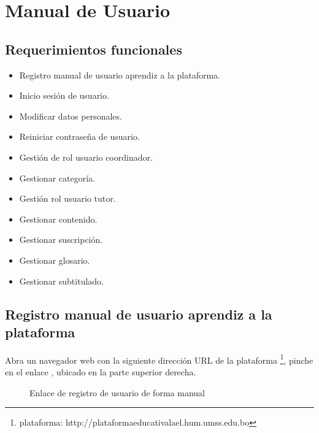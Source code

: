\chapter{Manual de Usuario}

\section{Requerimientos funcionales}

\begin{itemize}

\item Registro manual de usuario aprendiz a la plataforma.

\item Inicio sesión de usuario.

\item Modificar datos personales.
	
\item Reiniciar contraseña de usuario.

\item Gestión de rol usuario coordinador.

\item Gestionar categoría.

\item Gestión rol usuario tutor.

\item Gestionar contenido.

\item Gestionar suscripción.

\item Gestionar glosario.

\item Gestionar subtitulado.

\end{itemize}

\section{Registro manual de usuario aprendiz a la plataforma} \label{sec:createManualUser}

Abra un navegador web con la siguiente dirección URL de la plataforma 
\footnote{plataforma: http://plataformaeducativalael.hum.umss.edu.bo}, pinche
en el enlace , ubicado en la parte superior
derecha.

\begin{figure}[!ht]
\centering
		\caption{Enlace de registro de usuario de forma manual}
\end{figure}

